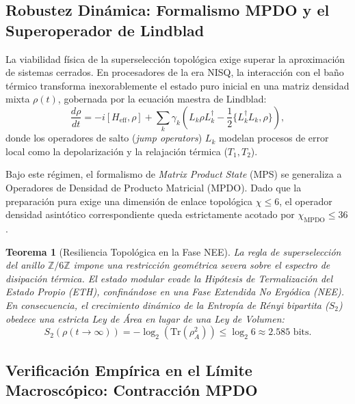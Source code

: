 \documentclass[12pt,a4paper]{article}
\theoremstyle{plain}
\newtheorem{teorema}{Teorema}[section]
\theoremstyle{definition}
\theoremstyle{remark}
\begin{document}
\subsection{Robustez Dinámica: Formalismo MPDO y el Superoperador de Lindblad}
\label{subsec:robustez_dinamica}

La viabilidad física de la superselección topológica exige superar la aproximación de sistemas cerrados. En procesadores de la era NISQ, la interacción con el baño térmico transforma inexorablemente el estado puro inicial en una matriz densidad mixta $\rho(t)$, gobernada por la ecuación maestra de Lindblad:
\begin{equation}
\frac{d\rho}{dt} = -i[H_{\text{eff}}, \rho] + \sum_k \gamma_k \left( L_k \rho L_k^\dagger - \frac{1}{2} \{L_k^\dagger L_k, \rho\} \right),
\end{equation}
donde los operadores de salto (\textit{jump operators}) $L_k$ modelan procesos de error local como la depolarización y la relajación térmica ($T_1, T_2$).

Bajo este régimen, el formalismo de \textit{Matrix Product State} (MPS) se generaliza a Operadores de Densidad de Producto Matricial (MPDO). Dado que la preparación pura exige una dimensión de enlace topológica $\chi \le 6$, el operador densidad asintótico correspondiente queda estrictamente acotado por $\chi_{\text{MPDO}} \le 36$.

\begin{teorema}[Resiliencia Topológica en la Fase NEE]
\label{teo:parent_lindbladian}
La regla de superselección del anillo $\mathbb{Z}/6\mathbb{Z}$ impone una restricción geométrica severa sobre el espectro de disipación térmica. El estado modular evade la Hipótesis de Termalización del Estado Propio (ETH), confinándose en una Fase Extendida No Ergódica (NEE). En consecuencia, el crecimiento dinámico de la Entropía de Rényi bipartita ($S_2$) obedece una estricta Ley de Área en lugar de una Ley de Volumen:
\begin{equation}
S_2(\rho(t \to \infty)) = -\log_2(\text{Tr}(\rho_A^2)) \le \log_2 6 \approx 2.585 \text{ bits}.
\end{equation}
\end{teorema}

\subsection{Verificación Empírica en el Límite Macroscópico: Contracción MPDO}
\label{subsec:verificacion_empirica}
\end{document}
